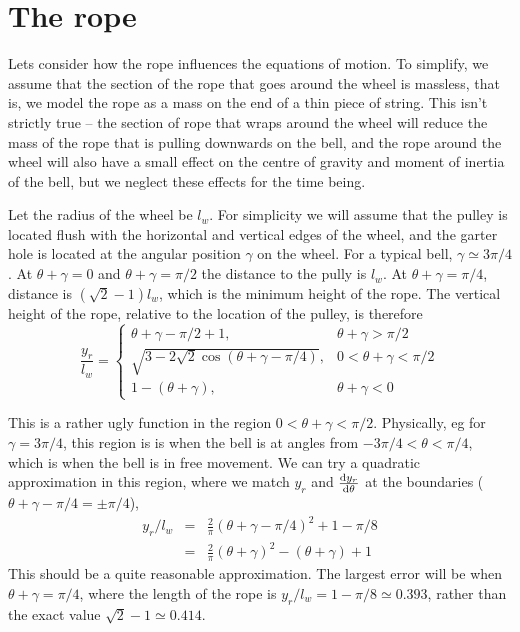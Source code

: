 \documentclass{article}
\begin{document}
\section{The rope}

Lets consider how the rope influences the equations of motion. To simplify, we assume that the section of the rope
that goes around the wheel is massless, that is, we model the rope as a mass on the end of a thin piece of string.
This isn't strictly true -- the section of rope that wraps around the wheel will reduce the mass of the rope
that is  pulling downwards on the bell, and  the rope around the wheel will also have a small effect on the
centre of gravity and moment of inertia of the bell, but we neglect these effects for the time being.

Let the radius of the wheel be $l_w$. For simplicity we will assume that the pulley is located flush with the
horizontal and vertical edges of the wheel, and the garter hole is located
at the angular position $\gamma$ on the wheel. For a typical bell, $\gamma \simeq 3\pi/4$.
At $\theta+\gamma = 0$ and $\theta+\gamma=\pi/2$ the distance
to the pully is $l_w$.  At $\theta+\gamma=\pi/4$, distance is $(\sqrt{2}-1) l_w$, which is the minimum height of the
rope. The 
vertical height of the
rope, relative to the location of the pulley, is therefore
\begin{equation}
  \frac{y_r}{l_w} = \begin{cases}
    \theta +\gamma - \pi/2 + 1, & \theta+\gamma > \pi/2  \\
    \sqrt{3 - 2\sqrt{2}\cos(\theta+\gamma - \pi/4)},& 0 < \theta+\gamma < \pi/2 \\
    1-(\theta+\gamma),&  \theta+\gamma< 0
  \end{cases}
\end{equation}

This is a rather ugly function in the region $ 0 < \theta+\gamma < \pi/2$. Physically, eg for $\gamma=3\pi/4$,
 this region is
is when the bell is at angles from $-3\pi/4 < \theta < \pi/4$, which is when the bell is in free movement.
We can try a quadratic approximation in this region,  where we match 
$y_r$ and $\frac{\mathrm{d} y_r}{\mathrm{d} \theta}$ at the boundaries ($\theta + \gamma - \pi/4 = \pm \pi/4$),
\begin{equation}
\begin{array}{rcl}
y_r/l_w &=& \frac{2}{\pi} (\theta+\gamma - \pi/4)^2 + 1 - \pi/8 \\
        &=& \frac{2}{\pi} (\theta+\gamma)^2 - (\theta+\gamma) + 1
\end{array}
\end{equation}
This should be a quite reasonable approximation. The largest error will be when $\theta+\gamma = \pi/4$, where
the length of the rope is $y_r/l_w = 1 - \pi/8 \simeq 0.393$, rather than the exact value $\sqrt{2}-1 \simeq 0.414$.
\end{document}
